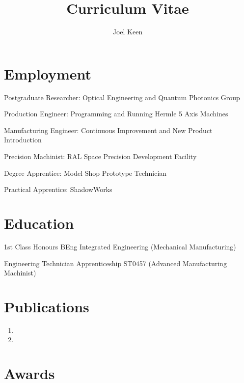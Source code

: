 \documentclass{cv}
\title{Curriculum Vitae}
\author{Joel Keen}
\begin{document}


\maketitle

\section{Employment}

Postgraduate Researcher: Optical Engineering and Quantum Photonics Group

Production Engineer: Programming and Running Hermle 5 Axis Machines

Manufacturing Engineer: Continuous Improvement and New Product Introduction

Precision Machinist: RAL Space Precision Development Facility

Degree Apprentice: Model Shop Prototype Technician 

Practical Apprentice: ShadowWorks

\section{Education}

1st Class Honours BEng Integrated Engineering (Mechanical Manufacturing)

 Engineering Technician Apprenticeship ST0457 (Advanced Manufacturing Machinist)

\section{Publications}
\begin{enumerate}

\item{}

\item{}


\end{enumerate}

\section{Awards}
\end{document}
